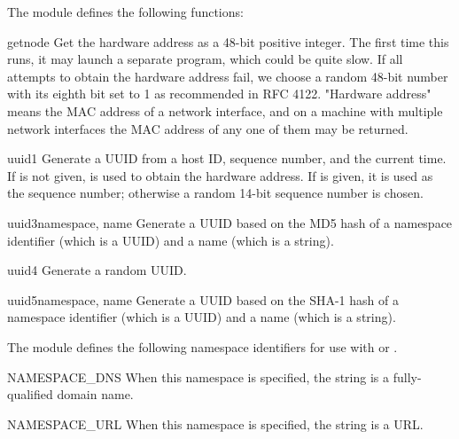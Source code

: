 The  module defines the following functions:

\begin{funcdesc}{getnode}{}
Get the hardware address as a 48-bit positive integer.  The first time this
runs, it may launch a separate program, which could be quite slow.  If all
attempts to obtain the hardware address fail, we choose a random 48-bit
number with its eighth bit set to 1 as recommended in RFC 4122.  "Hardware
address" means the MAC address of a network interface, and on a machine
with multiple network interfaces the MAC address of any one of them may
be returned.
\end{funcdesc}

\begin{funcdesc}{uuid1}{}
Generate a UUID from a host ID, sequence number, and the current time.
If  is not given,  is used to obtain the
hardware address.
If  is given, it is used as the sequence number;
otherwise a random 14-bit sequence number is chosen.
\end{funcdesc}

\begin{funcdesc}{uuid3}{namespace, name}
Generate a UUID based on the MD5 hash
of a namespace identifier (which is a UUID) and a name (which is a string).
\end{funcdesc}

\begin{funcdesc}{uuid4}{}
Generate a random UUID.
\end{funcdesc}

\begin{funcdesc}{uuid5}{namespace, name}
Generate a UUID based on the SHA-1 hash
of a namespace identifier (which is a UUID) and a name (which is a string).
\end{funcdesc}

The  module defines the following namespace identifiers
for use with  or .

\begin{datadesc}{NAMESPACE_DNS}
When this namespace is specified,
the  string is a fully-qualified domain name.
\end{datadesc}

\begin{datadesc}{NAMESPACE_URL}
When this namespace is specified,
the  string is a URL.
\end{datadesc}

